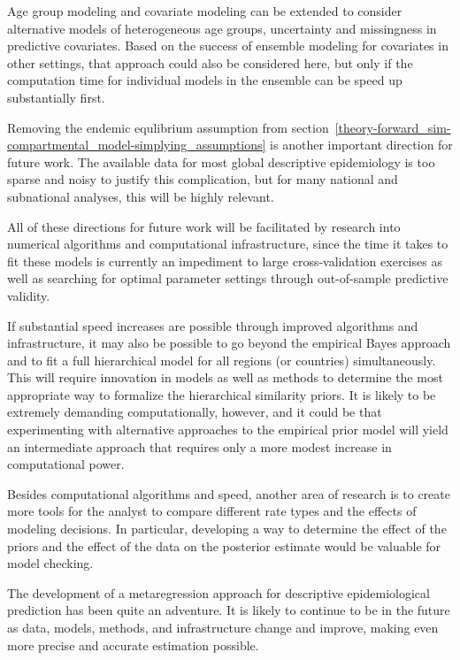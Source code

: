 Age group modeling and covariate modeling can be extended to consider
alternative models of heterogeneous age groups, uncertainty and
missingness in predictive covariates.  Based on the success of
ensemble modeling for covariates in other settings, that approach
could also be considered here, but only if the computation time for
individual models in the ensemble can be speed up substantially first.

Removing the endemic equlibrium assumption from
section~\ref{theory-forward_sim-compartmental_model-simplying_assumptions}
is another important direction for future work.  The available data
for most global descriptive epidemiology is too sparse and noisy to justify
this complication, but for many national and subnational analyses,
this will be highly relevant.


All of these directions for future work will be facilitated by
research into numerical algorithms and computational infrastructure,
since the time it takes to fit these models is currently an impediment
to large cross-validation exercises as well as searching for optimal
parameter settings through out-of-sample predictive validity.

If substantial speed increases are possible through improved algorithms and
infrastructure, it may also be possible to go beyond the empirical Bayes
approach and to fit a full hierarchical model for all regions (or
countries) simultaneously.  This will require innovation in models as
well as methods to determine the most appropriate way to formalize the
hierarchical similarity priors.  It is likely to be extremely
demanding computationally, however, and it could be that experimenting
with alternative approaches to the empirical prior model will yield an
intermediate approach that requires only a more modest increase in
computational power.





Besides computational algorithms and speed, another area of research
is to create more tools for the analyst to compare different rate
types and the effects of modeling decisions.  In particular,
developing a way to determine the effect of the priors and the effect
of the data on the posterior estimate would be valuable for model
checking.

The development of a metaregression approach for descriptive
epidemiological prediction has been quite an adventure.  It is likely
to continue to be in the future as data, models, methods, and
infrastructure change and improve, making even more precise and
accurate estimation possible.
